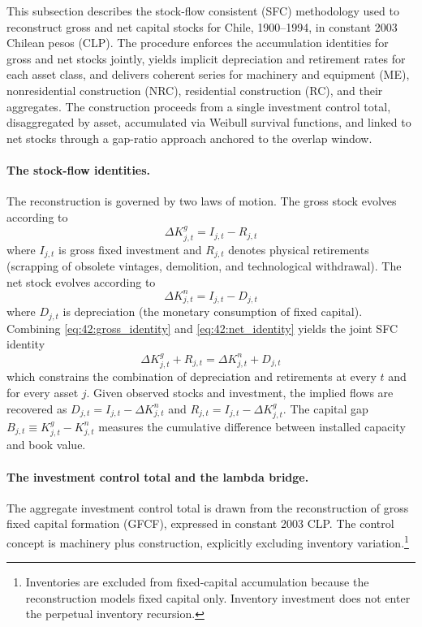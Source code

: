 This subsection describes the stock-flow consistent (SFC) methodology
used to reconstruct gross and net capital stocks for Chile,
1900--1994, in constant 2003 Chilean pesos (CLP). The procedure
enforces the accumulation identities for gross and net stocks
jointly, yields implicit depreciation and retirement rates for each
asset class, and delivers coherent series for machinery and equipment
(ME), nonresidential construction (NRC), residential construction
(RC), and their aggregates. The construction proceeds from a single
investment control total, disaggregated by asset, accumulated via
Weibull survival functions, and linked to net stocks through a
gap-ratio approach anchored to the \citet{Hofman2000b} overlap
window.

\paragraph{The stock-flow identities.}
The reconstruction is governed by two laws of motion. The gross
stock evolves according to
\begin{equation}
	\Delta K^{g}_{j,t} = I_{j,t} - R_{j,t}
	\label{eq:42:gross_identity}
\end{equation}
where $I_{j,t}$ is gross fixed investment and $R_{j,t}$ denotes
physical retirements (scrapping of obsolete vintages, demolition,
and technological withdrawal). The net stock evolves according to
\begin{equation}
	\Delta K^{n}_{j,t} = I_{j,t} - D_{j,t}
	\label{eq:42:net_identity}
\end{equation}
where $D_{j,t}$ is depreciation (the monetary consumption of fixed
capital). Combining \eqref{eq:42:gross_identity} and
\eqref{eq:42:net_identity} yields the joint SFC identity
\begin{equation}
	\Delta K^{g}_{j,t} + R_{j,t}
	= \Delta K^{n}_{j,t} + D_{j,t}
	\label{eq:42:joint_identity}
\end{equation}
which constrains the combination of depreciation and retirements at
every $t$ and for every asset $j$. Given observed stocks and
investment, the implied flows are recovered as $D_{j,t} = I_{j,t}
- \Delta K^{n}_{j,t}$ and $R_{j,t} = I_{j,t} - \Delta K^{g}_{j,t}$.
The capital gap $B_{j,t} \equiv K^{g}_{j,t} - K^{n}_{j,t}$ measures
the cumulative difference between installed capacity and book value.

\paragraph{The investment control total and the lambda bridge.}
The aggregate investment control total is drawn from the
\citet{PerezEyzaguirre2019} reconstruction of gross fixed capital
formation (GFCF), expressed in constant 2003 CLP. The control
concept is machinery plus construction, explicitly excluding
inventory variation.\footnote{Inventories are excluded from
	fixed-capital accumulation because the reconstruction models fixed
	capital only. Inventory investment does not enter the perpetual
	inventory recursion.}

